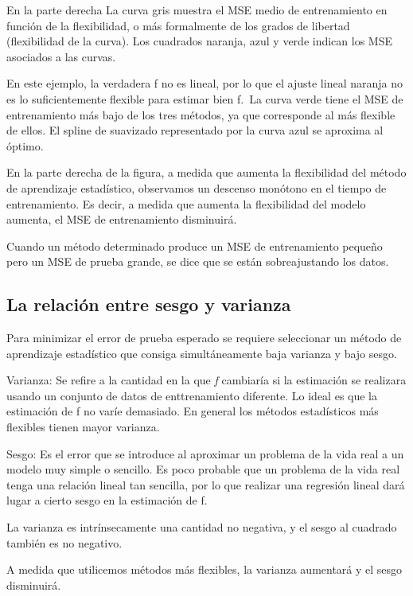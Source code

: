 \documentclass[
  letterpaper,
  DIV=11,
  numbers=noendperiod]{scrartcl}
\begin{document}
En la parte derecha La curva gris muestra el MSE medio de entrenamiento
en función de la flexibilidad, o más formalmente de los grados de
libertad (flexibilidad de la curva). Los cuadrados naranja, azul y verde
indican los MSE asociados a las curvas.

En este ejemplo, la verdadera f no es lineal, por lo que el ajuste
lineal naranja no es lo suficientemente flexible para estimar bien f.~La
curva verde tiene el MSE de entrenamiento más bajo de los tres métodos,
ya que corresponde al más flexible de ellos. El spline de suavizado
representado por la curva azul se aproxima al óptimo.

En la parte derecha de la figura, a medida que aumenta la flexibilidad
del método de aprendizaje estadístico, observamos un descenso monótono
en el tiempo de entrenamiento. Es decir, a medida que aumenta la
flexibilidad del modelo aumenta, el MSE de entrenamiento disminuirá.

Cuando un método determinado produce un MSE de entrenamiento pequeño
pero un MSE de prueba grande, se dice que se están sobreajustando los
datos.

\hypertarget{la-relaciuxf3n-entre-sesgo-y-varianza}{%
\subsection{La relación entre sesgo y
varianza}\label{la-relaciuxf3n-entre-sesgo-y-varianza}}

Para minimizar el error de prueba esperado se requiere seleccionar un
método de aprendizaje estadístico que consiga simultáneamente baja
varianza y bajo sesgo.

Varianza: Se refire a la cantidad en la que \emph{f} cambiaría si la
estimación se realizara usando un conjunto de datos de enttrenamiento
diferente. Lo ideal es que la estimación de f no varíe demasiado. En
general los métodos estadísticos más flexibles tienen mayor varianza.

Sesgo: Es el error que se introduce al aproximar un problema de la vida
real a un modelo muy simple o sencillo. Es poco probable que un problema
de la vida real tenga una relación lineal tan sencilla, por lo que
realizar una regresión lineal dará lugar a cierto sesgo en la estimación
de f.

La varianza es intrínsecamente una cantidad no negativa, y el sesgo al
cuadrado también es no negativo.

A medida que utilicemos métodos más flexibles, la varianza aumentará y
el sesgo disminuirá.
\end{document}
